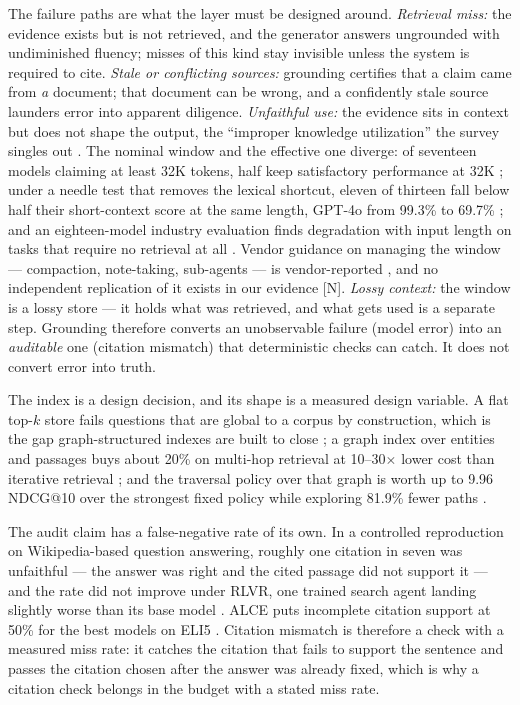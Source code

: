 The failure paths are what the layer must be designed around. \emph{Retrieval miss:} the
evidence exists but is not retrieved, and the generator answers ungrounded with undiminished
fluency; misses of this kind stay invisible unless the system is required to cite. \emph{Stale
or conflicting sources:} grounding certifies that a claim came from \emph{a} document; that
document can be wrong, and a confidently stale source launders error into apparent diligence.
\emph{Unfaithful use:} the evidence sits in context but does not shape the output, the
``improper knowledge utilization'' the survey singles out \cite{id250206872}. The nominal
window and the effective one diverge: of seventeen models claiming at least 32K tokens, half
keep satisfactory performance at 32K \cite{id240406654} \evindep{}; under a needle test that
removes the lexical shortcut, eleven of thirteen fall below half their short-context score at
the same length, GPT-4o from 99.3\% to 69.7\% \cite{id250205167} \evindep{}; and an
eighteen-model industry evaluation finds degradation with input length on tasks that require no
retrieval at all \cite{chroma2025contextrot} \evindep{}. Vendor guidance on managing the window
--- compaction, note-taking, sub-agents --- is vendor-reported \cite{anthropic2025context}
\evvendor{}, and no independent replication of it exists in our evidence \textsf{[N]}.
\emph{Lossy context:} the window is a lossy store --- it holds what was retrieved, and what gets
used is a separate step. Grounding therefore converts an unobservable failure (model error) into
an \emph{auditable} one (citation mismatch) that deterministic checks can catch. It does not
convert error into truth.

The index is a design decision, and its shape is a measured design variable. A flat top-$k$
store fails questions that are global to a corpus by construction, which is the gap
graph-structured indexes are built to close \cite{id240416130} \evaurep{}; a graph index over
entities and passages buys about 20\% on multi-hop retrieval at 10--30$\times$ lower cost than
iterative retrieval \cite{id240514831} \evaurep{}; and the traversal policy over that graph is
worth up to 9.96 NDCG@10 over the strongest fixed policy while exploring 81.9\% fewer paths
\cite{id260911065} \evaurep{}. 

The audit claim has a false-negative rate of its own. In a controlled reproduction on
Wikipedia-based question answering, roughly one citation in seven was unfaithful --- the answer
was right and the cited passage did not support it --- and the rate did not improve under RLVR,
one trained search agent landing slightly worse than its base model \cite{id260923053}
\evindep{}. ALCE puts incomplete citation support at 50\% for the best models on ELI5
\cite{id230514627} \evindep{}. Citation mismatch is therefore a check with a measured miss rate:
it catches the citation that fails to support the sentence and passes the citation chosen after
the answer was already fixed, which is why a citation check belongs in the budget with a stated
miss rate.

